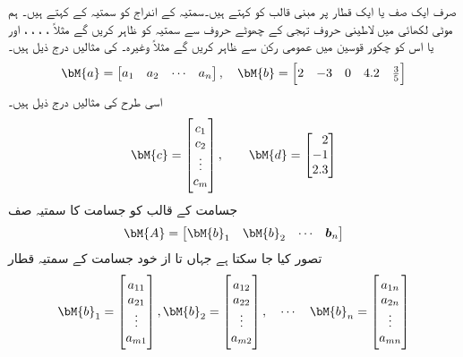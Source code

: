صرف ایک صف یا ایک قطار پر مبنی قالب کو  کہتے ہیں۔سمتیہ کے اندراج کو سمتیہ کے  کہتے ہیں۔ ہم موٹی لکھائی میں لاطینی حروف تہجی  کے چھوٹے حروف سے سمتیہ کو ظاہر کریں گے مثلاً ، ، ، ، اور یا اس کو   چکور قوسین میں عمومی رکن سے ظاہر کریں گے مثلاً  وغیرہ۔  کی مثالیں درج ذیل ہیں۔
\begin{align*}
\bM{a}=
\begin{bmatrix}
a_1& a_2 & \cdots & a_n
\end{bmatrix}, \quad 
\bM{b}=
\begin{bmatrix}
2& -3&0& 4.2& \tfrac{3}{5} 
\end{bmatrix}
\end{align*}
اسی طرح  کی مثالیں درج ذیل ہیں۔
\begin{align*}
\bM{c}=
\begin{bmatrix}
c_1\\
c_2\\
\vdots\\
c_m
\end{bmatrix}, \quad \quad
\bM{d}=
\begin{bmatrix*}[r]
2\\
-1\\
2.3
\end{bmatrix*}
\end{align*}
  جسامت کے قالب  کو  جسامت کا سمتیہ صف
\begin{align}
 \bM{A}=\begin{bmatrix} \bM{b}_1&\bM{b}_2&\cdots&\bm{b}_n \end{bmatrix}
\end{align}
تصور کیا جا سکتا ہے جہاں  تا  از خود   جسامت کے سمتیہ قطار 
\begin{align}
\bM{b}_1=\begin{bmatrix} a_{11} \\ a_{21}  \\ \vdots \\  a_{m1}  \end{bmatrix}, \bM{b}_2=\begin{bmatrix} a_{12} \\ a_{22}  \\ \vdots \\  a_{m2}  \end{bmatrix}, \quad \cdots \quad \bM{b}_n=\begin{bmatrix} a_{1n} \\ a_{2n}  \\ \vdots \\  a_{mn}  \end{bmatrix} 
\end{align}
